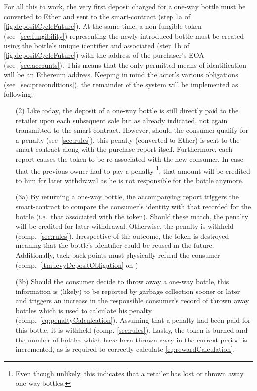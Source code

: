 For all this to work, the very first deposit charged for a one-way bottle must be converted to Ether and sent to the smart-contract (step 1a of \autoref{fig:depositCycleFuture})\label{itm:basicRequirement}. At the same time, a non-fungible token (see~\ref{sec:fungibility}) representing the newly introduced bottle must be created using the bottle's unique identifier and associated (step 1b of \autoref{fig:depositCycleFuture}) with the address of the purchaser's \ac{EOA} (see~\ref{sec:accounts}). This means that the only permitted means of identification will be an Ethereum address. Keeping in mind the actor's various obligations (see~\ref{sec:preconditions}), the remainder of the system will be implemented as following: 

\begin{itemize}
	\item [(2)] Like today, the deposit of a one-way bottle is still directly paid to the retailer upon each subsequent sale but as already indicated, not again transmitted to the smart-contract. However, should the consumer qualify for a penalty (see~\ref{sec:rules}), this penalty (converted to Ether) is sent to the smart-contract along with the purchase report itself. Furthermore, each report causes the token to be re-associated with the new consumer. In case that the previous owner had to pay a penalty \footnote{Even though unlikely, this indicates that a retailer has lost or thrown away one-way bottles.}, that amount will be credited to him for later withdrawal as he is not responsible for the bottle anymore.
	\item [(3a)] By returning a one-way bottle, the accompanying report triggers the smart-contract to compare the consumer's identity with that recorded for the bottle (i.e.~that associated with the token). Should these match, the penalty will be credited for later withdrawal. Otherwise, the penalty is withheld (comp.~\ref{sec:rules}). Irrespective of the outcome, the token is destroyed meaning that the bottle's identifier could be reused in the future. Additionally, tack-back points must physically refund the consumer (comp.~\ref{itm:levyDepositObligation} on )
	\item [(3b)] Should the consumer decide to throw away a one-way bottle, this information is (likely) to be reported by garbage collection sooner or later and triggers an increase in the responsible consumer's record of thrown away bottles which is used to calculate his penalty (comp.~\autoref{eq:penaltyCalculcation}). Assuming that a penalty had been paid for this bottle, it is withheld (comp. \ref{sec:rules}). Lastly, the token is burned and the number of bottles which have been thrown away in the current period is incremented, as is required to correctly calculate \autoref{eq:rewardCalculation}.

\end{itemize}
